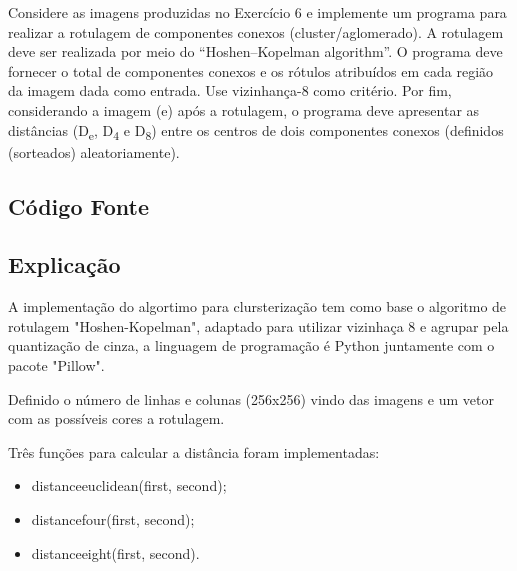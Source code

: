 \documentclass[10pt,a4paper]{article}
\begin{document}
\begin{flushleft}
Considere as imagens produzidas no Exercício 6 e implemente um programa para realizar a rotulagem de componentes conexos (cluster/aglomerado). A rotulagem deve ser realizada por meio do “Hoshen–Kopelman algorithm”. O programa deve fornecer o total de componentes conexos e os rótulos atribuídos em cada região da imagem dada como entrada. Use vizinhança-8 como critério. Por fim, considerando a imagem (e) após a rotulagem, o programa deve apresentar as distâncias (D\textsubscript{e}, D\textsubscript{4} e D\textsubscript{8}) entre os centros de dois componentes conexos (definidos (sorteados) aleatoriamente).
\end{flushleft}

\subsection{Código Fonte}



\subsection{Explicação}

\begin{flushleft}
A implementação do algortimo para clursterização tem como base o algoritmo de rotulagem "Hoshen-Kopelman", adaptado para utilizar vizinhaça 8 e agrupar pela quantização de cinza, a linguagem de programação é Python juntamente com o pacote "Pillow".
\end{flushleft}

\begin{flushleft}
Definido o número de linhas e colunas (256x256) vindo das imagens e um vetor com as possíveis cores a rotulagem.
\end{flushleft}

\begin{flushleft}
Três funções para calcular a distância foram implementadas:
\end{flushleft}

\begin{itemize}
    \item {\ttfamily distance\textunderscore euclidean(first, second)};
    \item {\ttfamily distance\textunderscore four(first, second)};
    \item {\ttfamily distance\textunderscore eight(first, second)}.
\end{itemize}
\end{document}
